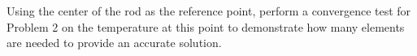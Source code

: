 Using the center of the rod as the reference point, perform a convergence test for Problem 2 on the temperature at this point to demonstrate how many elements are needed to provide an accurate solution.